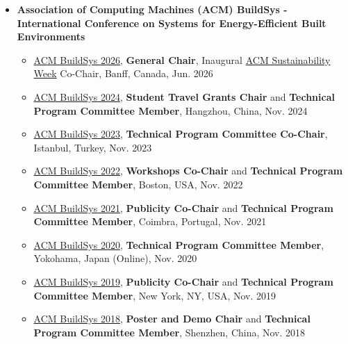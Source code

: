 \documentclass[10pt,a4paper]{article}
\begin{document}
\begin{small}
\begin{itemize}
\item
\textbf{Association of Computing Machines (ACM) BuildSys - International Conference on Systems for Energy-Efficient Built Environments}
\begin{itemize}
\item \href{https://buildsys.acm.org/2026}{ACM BuildSys 2026}, \textbf{General Chair}, Inaugural \href{https://energy.acm.org/sustainability-week/z}{ACM Sustainability Week} Co-Chair, Banff, Canada, Jun. 2026
\item \href{https://buildsys.acm.org/2024/}{ACM BuildSys 2024}, \textbf{Student Travel Grants Chair} and \textbf{Technical Program Committee Member}, Hangzhou, China, Nov. 2024
\item \href{https://buildsys.acm.org/2023/}{ACM BuildSys 2023}, \textbf{Technical Program Committee Co-Chair}, Istanbul, Turkey, Nov. 2023
\item \href{https://buildsys.acm.org/2022/}{ACM BuildSys 2022}, \textbf{Workshops Co-Chair} and \textbf{Technical Program Committee Member}, Boston, USA, Nov. 2022
\item \href{https://buildsys.acm.org/2020/}{ACM BuildSys 2021}, \textbf{Publicity Co-Chair} and \textbf{Technical Program Committee Member}, Coimbra, Portugal, Nov. 2021
\item \href{https://buildsys.acm.org/2020/}{ACM BuildSys 2020}, \textbf{Technical Program Committee Member}, Yokohama, Japan (Online), Nov. 2020
\item \href{https://buildsys.acm.org/2019/}{ACM BuildSys 2019}, \textbf{Publicity Co-Chair} and \textbf{Technical Program Committee Member}, New York, NY, USA, Nov. 2019
\item \href{https://buildsys.acm.org/2018/}{ACM BuildSys 2018}, \textbf{Poster and Demo Chair} and \textbf{Technical Program Committee Member}, Shenzhen, China, Nov. 2018
\end{itemize}


\end{itemize}
\end{small}
\end{document}
